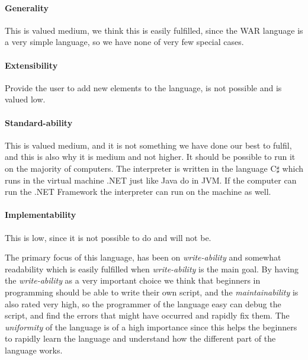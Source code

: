\paragraph{Generality} This is valued medium, we think this is easily fulfilled, since the WAR language is a very simple language, so we have none of very few special cases.

\paragraph{Extensibility} Provide the user to add new elements to the language, is not possible and is valued low.

\paragraph{Standard-ability} This is valued medium, and it is not something we have done our best to fulfil, and this is also why it is medium and not higher. It should be possible to run it on the majority of computers. The interpreter is written in the language C$\sharp$ which runs in the virtual machine .NET just like Java do in JVM. If the computer can run the .NET Framework the interpreter can run on the machine as well.

\paragraph{Implementability} This is low, since it is not possible to do and will not be.


The primary focus of this language, has been on \textit{write-ability} and somewhat readability which is easily fulfilled when \textit{write-ability} is the main goal. By having the \textit{write-ability} as a very important choice we think that beginners in programming should be able to write their own script, and the \textit{maintainability} is also rated very high, so the programmer of the language easy can debug the script, and find the errors that might have occurred and rapidly fix them. The \textit{uniformity} of the language is of a high importance since this helps the beginners to rapidly learn the language and understand how the different part of the language works.


